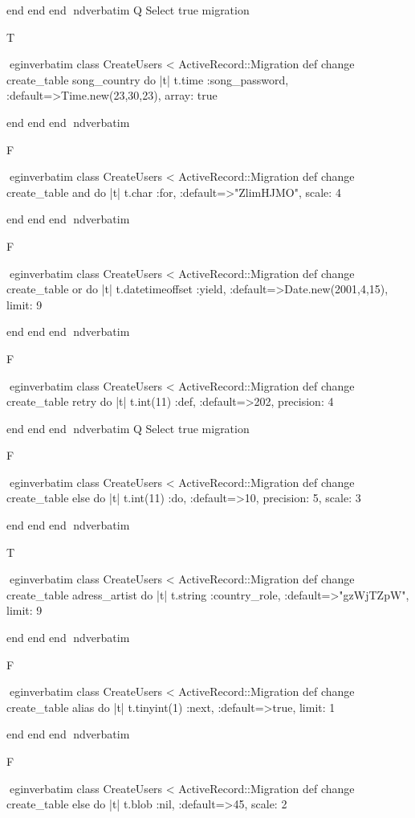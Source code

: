     end 
  end 
end
nd{verbatim}
Q
 Select true migration

T

egin{verbatim}
 class CreateUsers < ActiveRecord::Migration 
  def change 
    create_table song_country do |t| 
      t.time :song_password, :default=>Time.new(23,30,23), array: true
    
    end 
  end 
end
nd{verbatim}

F

egin{verbatim}
 class CreateUsers < ActiveRecord::Migration 
  def change 
    create_table and do |t| 
      t.char :for, :default=>"ZlimHJMO", scale: 4
    
    end 
  end 
end
nd{verbatim}

F

egin{verbatim}
 class CreateUsers < ActiveRecord::Migration 
  def change 
    create_table or do |t| 
      t.datetimeoffset :yield, :default=>Date.new(2001,4,15), limit: 9
    
    end 
  end 
end
nd{verbatim}

F

egin{verbatim}
 class CreateUsers < ActiveRecord::Migration 
  def change 
    create_table retry do |t| 
      t.int(11) :def, :default=>202, precision: 4
    
    end 
  end 
end
nd{verbatim}
Q
 Select true migration

F

egin{verbatim}
 class CreateUsers < ActiveRecord::Migration 
  def change 
    create_table else do |t| 
      t.int(11) :do, :default=>10, precision: 5, scale: 3
    
    end 
  end 
end
nd{verbatim}

T

egin{verbatim}
 class CreateUsers < ActiveRecord::Migration 
  def change 
    create_table adress_artist do |t| 
      t.string :country_role, :default=>"gzWjTZpW", limit: 9
    
    end 
  end 
end
nd{verbatim}

F

egin{verbatim}
 class CreateUsers < ActiveRecord::Migration 
  def change 
    create_table alias do |t| 
      t.tinyint(1) :next, :default=>true, limit: 1
    
    end 
  end 
end
nd{verbatim}

F

egin{verbatim}
 class CreateUsers < ActiveRecord::Migration 
  def change 
    create_table else do |t| 
      t.blob :nil, :default=>45, scale: 2
    
